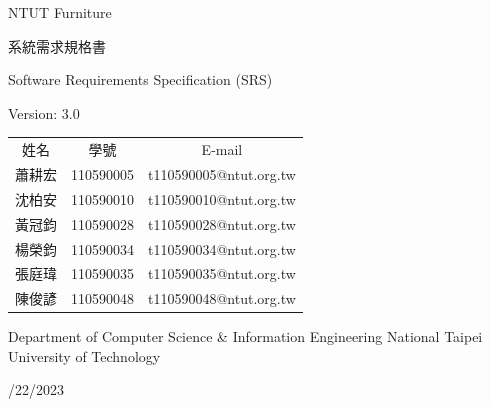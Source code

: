 \documentclass[a4paper, 12pt]{article}
\def\myProjectName{NTUT Furniture}
\def\myVersion{3.0}
\newcommand\TwentyTitle{\fontsize{20pt}{24pt}\selectfont}
\newcommand\EighteenTitle{\fontsize{18pt}{20pt}\selectfont}
\newcommand\SixteenTitle{\fontsize{16pt}{18pt}\selectfont}
\begin{document}
\thispagestyle{empty}
\begin{center}
    {\TwentyTitle \myProjectName \par}
    \vspace{6cm}
    {\TwentyTitle 系統需求規格書 \par}
    {\EighteenTitle Software Requirements Specification (SRS) \par}
    {\SixteenTitle Version: \myVersion \par}
    \vspace{4cm}
    {\SixteenTitle
    \renewcommand{\arraystretch}{1.3} %
    \begin{tabular}{ccc}
      姓名 & 學號 & E-mail \\[0.2em]
      蕭耕宏& 110590005& t110590005@ntut.org.tw \\
      沈柏安& 110590010& t110590010@ntut.org.tw \\
      黃冠鈞& 110590028& t110590028@ntut.org.tw \\
      楊榮鈞& 110590034& t110590034@ntut.org.tw \\
      張庭瑋& 110590035& t110590035@ntut.org.tw \\
      陳俊諺& 110590048& t110590048@ntut.org.tw \\
    \end{tabular}
    \renewcommand{\arraystretch}{1} %
    \par}
    \vspace{2cm}
    {\SixteenTitle Department of Computer Science \& Information Engineering National Taipei University of Technology \par}
    \vspace{16pt}
    {\SixteenTitle 11/22/2023 \par}
\end{center}
\clearpage

\renewcommand{\contentsname}{目錄 (Table of Contents)}
\tableofcontents
\newpage



\end{document}
